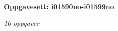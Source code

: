 \centerline{\bf Oppgavesett: i01590no-i01599no}
\vskip 10pt
\centerline{\it 10 oppgaver}\vskip 10pt
\vskip 10pt
